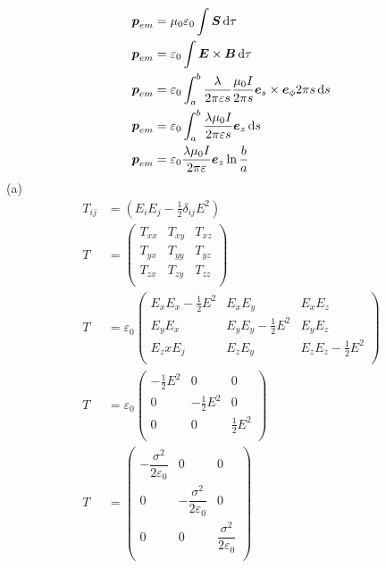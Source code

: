 \begin{align*}
    \boldsymbol{p}_{em}&=\mu_0\varepsilon_0\int\boldsymbol{S}\dif\tau\\
    \boldsymbol{p}_{em}&=\varepsilon_0\int\boldsymbol{E}\times\boldsymbol{B}\dif\tau\\
    \boldsymbol{p}_{em}&=\varepsilon_0\int_a^b\frac{\lambda}{2\pi\varepsilon s}\frac{\mu_0I}{2\pi s}\boldsymbol{e}_s\times\boldsymbol{e}_\phi2\pi s\dif s\\
    \boldsymbol{p}_{em}&=\varepsilon_0\int_a^b\frac{\lambda\mu_0I}{2\pi\varepsilon s}\boldsymbol{e}_z\dif s\\
    \boldsymbol{p}_{em}&=\varepsilon_0\frac{\lambda\mu_0I}{2\pi\varepsilon}\boldsymbol{e}_z\ln\frac{b}{a}
\end{align*}
(a)\begin{align*}
    T_{ij}&=\left(E_iE_j-\frac{1}{2}\delta_{ij}E^2\right)\\
    T&=\left(\begin{matrix}
        T_{xx}&T_{xy}&T_{xz}\\
        T_{yx}&T_{yy}&T_{yz}\\
        T_{zx}&T_{zy}&T_{zz}\\
    \end{matrix}\right)\\
    T&=\varepsilon_0\left(\begin{matrix}
        E_xE_x-\frac{1}{2}E^2&E_xE_y&E_xE_z\\
        E_yE_x&E_yE_y-\frac{1}{2}E^2&E_yE_z\\
        E_zxE_j&E_zE_y&E_zE_z-\frac{1}{2}E^2\\
    \end{matrix}\right)\\
    T&=\varepsilon_0\left(\begin{matrix}
        -\frac{1}{2}E^2&0&0\\
        0&-\frac{1}{2}E^2&0\\
        0&0&\frac{1}{2}E^2\\
    \end{matrix}\right)\\
    T&=\left(\begin{matrix}
        -\dfrac{\sigma^2}{2\varepsilon_0}&0&0\\
        0&-\dfrac{\sigma^2}{2\varepsilon_0}&0\\
        0&0&\dfrac{\sigma^2}{2\varepsilon_0}\\
    \end{matrix}\right)
\end{align*}

